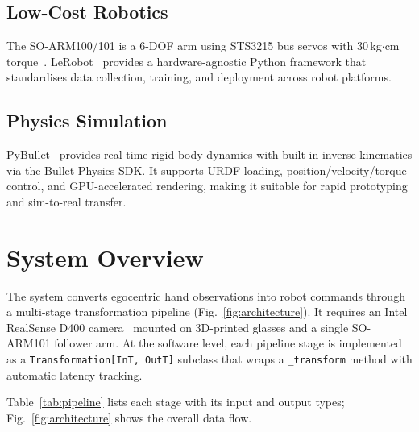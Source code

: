 \documentclass[10pt,journal]{IEEEtran}
\begin{document}
\subsection{Low-Cost Robotics}
The SO-ARM100/101 is a 6-DOF arm using STS3215 bus servos
with 30\,kg$\cdot$cm torque~\cite{soarm100}. LeRobot~\cite{lerobot2024}
provides a hardware-agnostic Python framework that standardises data
collection, training, and deployment across robot platforms.

\subsection{Physics Simulation}
PyBullet~\cite{coumans2021pybullet} provides real-time rigid body
dynamics with built-in inverse kinematics via the Bullet Physics SDK.
It supports URDF loading, position/velocity/torque control, and
GPU-accelerated rendering, making it suitable for rapid prototyping
and sim-to-real transfer.

\section{System Overview}
\label{sec:system}

The system converts egocentric hand observations into robot
commands through a multi-stage transformation pipeline
(Fig.~\ref{fig:architecture}). It requires an Intel RealSense
D400 camera~\cite{keselman2017realsense} mounted on 3D-printed glasses
and a single SO-ARM101 follower arm. At the software level, each
pipeline stage is implemented as a \texttt{Transformation[InT, OutT]}
subclass that wraps a \texttt{\_transform} method with automatic
latency tracking.

Table~\ref{tab:pipeline} lists each stage with its input and output
types; Fig.~\ref{fig:architecture} shows the overall data flow.
\end{document}
